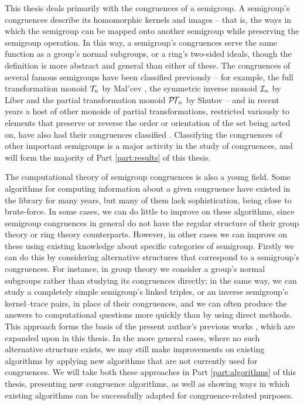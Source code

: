 This thesis deals primarily with the congruences of a semigroup.  A semigroup's
congruences describe its homomorphic kernels and images -- that is, the ways in
which the semigroup can be mapped onto another semigroup while preserving the
semigroup operation.  In this way, a semigroup's congruences serve the same
function as a group's normal subgroups, or a ring's two-sided ideals, though the
definition is more abstract and general than either of these.  The congruences
of several famous semigroups have been classified previously -- for example, the
full transformation monoid $\mathcal{T}_n$ by Mal$'$cev \cite{malcev_1952}, the symmetric
inverse monoid $\mathcal{I}_n$ by Liber \cite{liber_1953} and the partial transformation
monoid $\mathcal{P\!T\!}_n$ by Shutov \cite{shutov_1988} -- and in recent years a host of
other monoids of partial transformations, restricted variously to elements that
preserve or reverse the order or orientation of the set being acted on, have
also had their congruences classified \cite{fernandes_2000, lisbon_ii,
  lisbon_i}.  Classifying the congruences of other important semigroups is a
major activity in the study of congruences, and will form the majority of Part
\ref{part:results} of this thesis.

The computational theory of semigroup congruences is also a young field.  Some
algorithms for computing information about a given congruence have existed in
the \GAP{} library for many years, but many of them lack sophistication, being
close to brute-force.  In some cases, we can do little to improve on these
algorithms, since semigroup congruences in general do not have the regular
structure of their group theory or ring theory counterparts.  However, in other
cases we can improve on these using existing knowledge about specific categories
of semigroup.  Firstly we can do this by considering alternative structures that
correspond to a semigroup's congruences.  For instance, in group theory we
consider a group's normal subgroups rather than studying its congruences
directly; in the same way, we can study a completely simple semigroup's linked
triples, or an inverse semigroup's kernel--trace pairs, in place of their
congruences, and we can often produce the answers to computational questions
more quickly than by using direct methods.  This approach forms the basis of the
present author's previous works \cite{mtorpey_pre_msc, mtorpey_msc}, which are
expanded upon in this thesis. In the more general cases, where no such
alternative structure exists, we may still make improvements on existing
algorithms by applying new algorithms that are not currently used for
congruences.  We will take both these approaches in Part \ref{part:algorithms}
of this thesis, presenting new congruence algorithms, as well as showing ways in
which existing algorithms can be successfully adapted for congruence-related
purposes.

